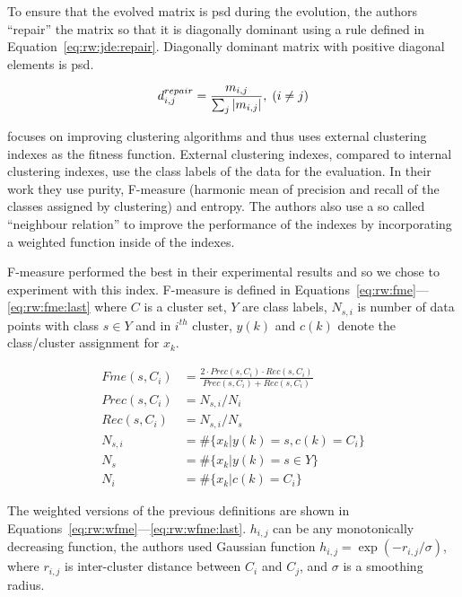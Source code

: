\documentclass[12pt,a4paper]{report}
\begin{document}
To ensure that the evolved matrix is \ac{psd} during the evolution, the authors ``repair'' the matrix so that it is diagonally dominant using a rule defined in Equation~\ref{eq:rw:jde:repair}. Diagonally dominant matrix with positive diagonal elements is \ac{psd}.

\begin{equation}
d_{i,j}^{repair} = \frac{m_{i,j}}{\sum_j \left|{m_{i,j}}\right|}, \; (i \neq j)
\label{eq:rw:jde:repair}
\end{equation}

\citep{fukui2013evolutionary} focuses on improving clustering algorithms and thus uses external clustering indexes as the fitness function. External clustering indexes, compared to internal clustering indexes, use the class labels of the data for the evaluation. In their work they use purity, \mbox{F-measure} (harmonic mean of precision and recall of the classes assigned by clustering) and entropy. The authors also use a so called ``neighbour relation'' to improve the performance of the indexes by incorporating a weighted function inside of the indexes. 

\mbox{F-measure} performed the best in their experimental results and so we chose to experiment with this index. \mbox{F-measure} is defined in Equations~\ref{eq:rw:fme}---\ref{eq:rw:fme:last} where $C$ is a cluster set, $Y$ are class labels, $N_{s,i}$ is number of data points with class $s \in Y$ and in $i^{th}$ cluster, $y(k)$ and $c(k)$ denote the class/cluster assignment for $x_k$.

\begin{align}
Fme(s,C_i) &= \frac{2 \cdot Prec(s,C_i) \cdot Rec(s, C_i)}{Prec(s,C_i) + Rec(s, C_i)} \label{eq:rw:fme} \\
Prec(s,C_i) &= N_{s,i}/N_i \\
Rec(s,C_i) &= N_{s,i}/N_s \\
N_{s,i} &= \#\{x_k | y(k)=s, c(k)=C_i\} \\
N_s &= \#\{x_k | y(k)=s \in Y\} \\
N_i &= \#\{x_k | c(k)=C_i\} \label{eq:rw:fme:last}
\end{align}

The weighted versions of the previous definitions are shown in Equations~\ref{eq:rw:wfme}---\ref{eq:rw:wfme:last}. $h_{i,j}$ can be any monotonically decreasing function, the authors used Gaussian function $h_{i,j}=\exp(-r_{i,j}/\sigma)$, where $r_{i,j}$ is inter-cluster distance between $C_i$ and $C_j$, and $\sigma$ is a smoothing radius.
\end{document}
